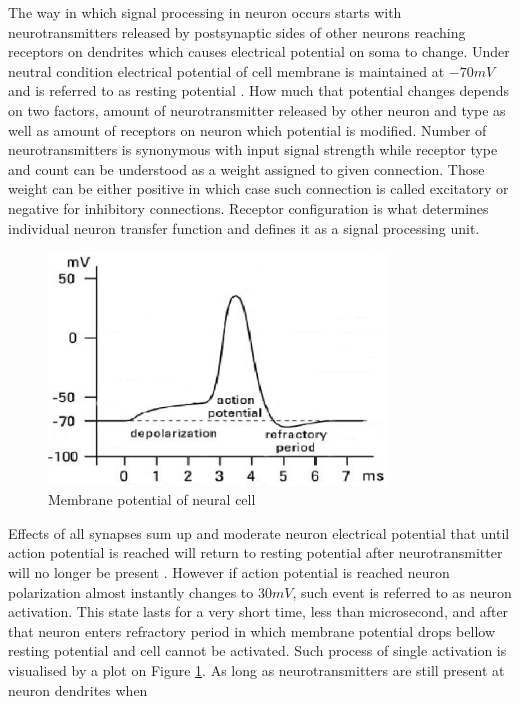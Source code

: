 The way in which signal processing in neuron occurs starts with neurotransmitters released by
postsynaptic sides of other neurons reaching receptors on dendrites which causes electrical
potential on soma to change. Under neutral condition electrical potential of cell membrane is 
maintained at $-70 mV$ and is referred to as resting potential \cite{Tadeusiewicz1994}. 
How much that potential changes depends on two factors, amount of neurotransmitter released by 
other neuron and type as well as  amount of receptors on neuron which potential is modified.
Number of neurotransmitters is synonymous with input signal strength while receptor type and count
can be understood as a  weight assigned to given connection.
Those weight can be either positive in which case such connection is called excitatory or negative 
for inhibitory connections. 
Receptor configuration is what determines individual neuron transfer function and defines it as 
a signal processing unit.  
\begin{figure}[htb] 
	\centering
	\includegraphics[width=0.8\textwidth]{figures/bio_activation}
	\caption{Membrane potential of neural cell \cite{Verber2012}}
	\label{fig:bio_activation}
\end{figure}
Effects of all synapses sum up and moderate neuron electrical potential that until action 
potential is reached will return to resting potential after neurotransmitter will no longer
be present \cite{Osowski1994}. However if action potential is reached neuron polarization almost
instantly changes to $30 mV$, such event is referred to as neuron activation. 
This state lasts for a very short time, less than microsecond, and after that neuron enters
refractory period in which membrane potential drops bellow resting potential and cell cannot
be activated. Such process of single activation is visualised by a plot on Figure 
\ref{fig:bio_activation}. As long as neurotransmitters are still present at neuron dendrites when
